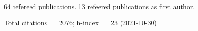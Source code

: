 64 refereed publications. 13 refeered publications as first author.

Total citations~=~2076; h-index~=~23 (2021-10-30)